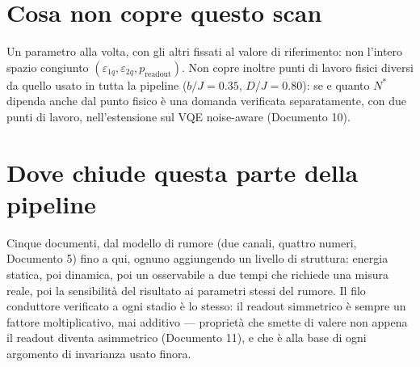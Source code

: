 \documentclass[11pt,a4paper]{article}
\begin{document}
\section{Cosa non copre questo scan}

Un parametro alla volta, con gli altri fissati al valore di riferimento: non
l'intero spazio congiunto $(\varepsilon_{1q},\varepsilon_{2q},p_\text{readout})$.
Non copre inoltre punti di lavoro fisici diversi da quello usato in tutta la
pipeline ($b/J=0.35$, $D/J=0.80$): se e quanto $N^*$ dipenda anche dal punto
fisico è una domanda verificata separatamente, con due punti di lavoro,
nell'estensione sul VQE noise-aware (Documento 10).

\section{Dove chiude questa parte della pipeline}

Cinque documenti, dal modello di rumore (due canali, quattro numeri, Documento
5) fino a qui, ognuno aggiungendo un livello di struttura: energia statica,
poi dinamica, poi un osservabile a due tempi che richiede una misura reale,
poi la sensibilità del risultato ai parametri stessi del rumore. Il filo
conduttore verificato a ogni stadio è lo stesso: il readout simmetrico è
sempre un fattore moltiplicativo, mai additivo --- proprietà che smette di
valere non appena il readout diventa asimmetrico (Documento 11), e che è alla
base di ogni argomento di invarianza usato finora.

\end{document}
